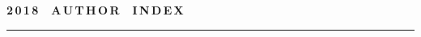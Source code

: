  \label{end\stat}

\newpage


\def\stat{cont-e}
{%
\raggedleft\Large \bf%
2\,0\,1\,8\ \ A\,U\,T\,H\,O\,R\ \ I\,N\,D\,E\,X \vskip 17pt
 \hrule
 \par
{} }

\label{st\stat}

\def\tit{\ }

\def\aut{\ }
\def\auf{\ }

\def\leftkol{\ } %

\def\rightkol{\ } %

\titele{\tit}{\aut}{\auf}{\leftkol}{\rightkol}

\def\leftfootline{\small{\textbf{\thepage}
\hfill INFORMATIKA I EE PRIMENENIYA~--- INFORMATICS AND APPLICATIONS\ \ \ 2018\
\ \ volume~12\ \ \ issue\ 4}
}%
 \def\rightfootline{\small{INFORMATIKA I EE PRIMENENIYA~--- INFORMATICS AND APPLICATIONS\ \ \ 2018\ \ \ volume~12\ \ \ issue\ 4
\hfill \textbf{\thepage}}}

\vspace*{-12pt}
\vspace*{-18pt}

